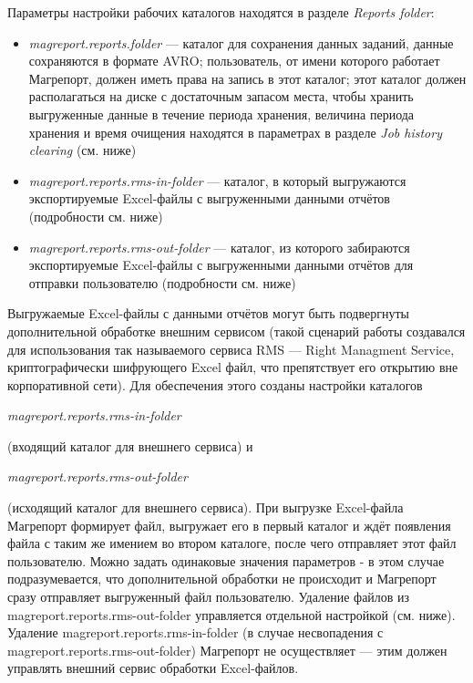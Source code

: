 \documentclass[../user-manual.tex]{subfiles}
\begin{document}
	Параметры настройки рабочих каталогов находятся в разделе \textit{Reports folder}:
	
	\begin{itemize}
		\item \textit{magreport.reports.folder} --- каталог для сохранения данных заданий, данные сохраняются в формате AVRO; пользователь, от имени которого работает Магрепорт, должен иметь права на запись в этот каталог; этот каталог должен располагаться на диске с достаточным запасом места, чтобы хранить выгруженные данные в течение периода хранения, величина периода хранения и время очищения находятся в параметрах в разделе \textit{Job history clearing} (см. ниже)
		
		\item \textit{magreport.reports.rms-in-folder} --- каталог, в который выгружаются экспортируемые Excel-файлы с выгруженными данными отчётов (подробности см. ниже)
		
		\item \textit{magreport.reports.rms-out-folder} --- каталог, из которого забираются экспортируемые Excel-файлы с выгруженными данными отчётов для отправки пользователю (подробности см. ниже)
		
	\end{itemize}

	Выгружаемые Excel-файлы с данными отчётов могут быть подвергнуты дополнительной обработке внешним сервисом (такой сценарий работы создавался для использования так называемого сервиса RMS --- Right Managment Service, криптографически шифрующего Excel файл, что препятствует его открытию вне корпоративной сети). Для обеспечения этого созданы настройки каталогов
	\begin{center}
		\textit{magreport.reports.rms-in-folder}
	\end{center}
	(входящий каталог для внешнего сервиса) и
	\begin{center}
		\textit{magreport.reports.rms-out-folder} 
	\end{center}
	(исходящий каталог для внешнего сервиса). При выгрузке Excel-файла Магрепорт формирует файл, выгружает его в первый каталог и ждёт появления файла с таким же имением во втором каталоге, после чего отправляет этот файл пользователю. Можно задать одинаковые значения параметров - в этом случае подразумевается, что дополнительной обработки не происходит и Магрепорт сразу отправляет выгруженный файл пользователю. Удаление файлов из magreport.reports.rms-out-folder управляется отдельной настройкой (см. ниже). Удаление magreport.reports.rms-in-folder (в случае несвопадения с magreport.reports.rms-out-folder) Магрепорт не осуществляет --- этим должен управлять внешний сервис обработки Excel-файлов.
\end{document}
